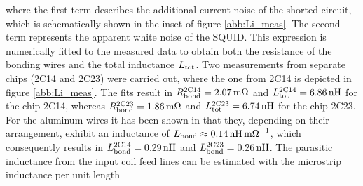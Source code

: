 
where the first term describes the additional current noise of the shorted circuit, which is schematically shown in the inset of figure \ref{abb:Li_meas}. The second term represents the apparent white noise of the SQUID. This expression is numerically fitted to the measured data to obtain both the resistance of the bonding wires and the total inductance $L_{\rm tot}$. Two measurements from separate chips (2C14 and 2C23) were carried out, where the one from 2C14 is depicted in figure \ref{abb:Li_meas}. The fits result in $R_{\rm bond}^{\rm 2C14}=\qty{2.07}{\milli\ohm}$ and $L_{\rm tot}^{\rm 2C14}=\qty{6.86}{\nH}$ for the chip 2C14, whereas $R_{\rm bond}^{\rm 2C23}=\qty{1.86}{\milli\ohm}$ and $L_{\rm tot}^{\rm 2C23}=\qty{6.74}{\nH}$ for the chip 2C23. For the aluminum wires it has been shown in \cite{Hengstler2017} that they, depending on their arrangement, exhibit an inductance of $L_{\rm bond}\approx\qty{0.14}{\nano\henry\per\milli\ohm}$, which consequently results in $L_{\rm bond}^{\rm 2C14}=\qty{0.29}{\nH}$ and  $L_{\rm bond}^{\rm 2C23}=\qty{0.26}{\nH}$. The parasitic inductance from the input coil feed lines can be estimated with the microstrip inductance per unit length \cite{Chang1979}


